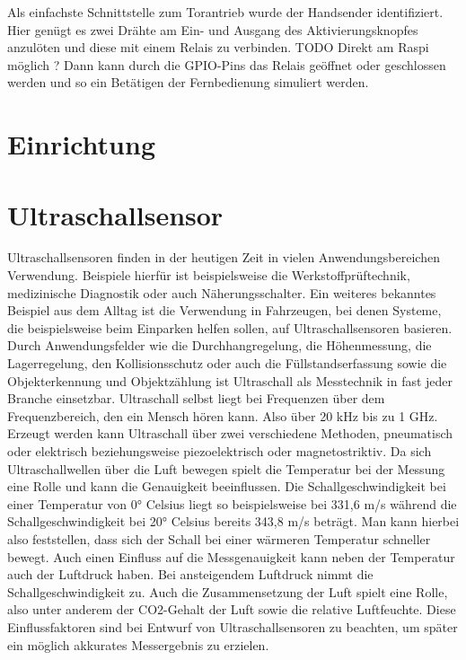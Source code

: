 Als einfachste Schnittstelle zum Torantrieb wurde der Handsender identifiziert. Hier genügt es zwei Drähte am Ein- und Ausgang des Aktivierungsknopfes anzulöten und diese mit einem Relais zu verbinden. TODO Direkt am Raspi möglich ? Dann kann durch die \ac{GPIO}-Pins das Relais geöffnet oder geschlossen werden und so ein Betätigen der Fernbedienung simuliert werden.

\section{Einrichtung}


\section{Ultraschallsensor}
Ultraschallsensoren finden in der heutigen Zeit in vielen Anwendungsbereichen Verwendung. Beispiele hierfür ist beispielsweise die Werkstoffprüftechnik, medizinische Diagnostik oder auch Näherungsschalter. Ein weiteres bekanntes Beispiel aus dem Alltag ist die Verwendung in Fahrzeugen, bei denen Systeme, die beispielsweise beim Einparken helfen sollen, auf Ultraschallsensoren basieren. Durch Anwendungsfelder wie die Durchhangregelung, die Höhenmessung, die Lagerregelung, den Kollisionsschutz oder auch die Füllstandserfassung sowie die Objekterkennung und Objektzählung ist Ultraschall als Messtechnik in fast jeder Branche einsetzbar.\autocite[Vgl.][S. 182]{ultraschall2}
Ultraschall selbst liegt bei Frequenzen über dem Frequenzbereich, den ein Mensch hören kann. Also über 20 kHz bis zu 1 GHz.\autocite[Vgl.][S. 177]{ultraschall2} Erzeugt werden kann Ultraschall über zwei verschiedene Methoden, pneumatisch oder elektrisch beziehungsweise piezoelektrisch oder magnetostriktiv.\autocite[Vgl.][S. 70]{sensoren} Da sich Ultraschallwellen über die Luft bewegen spielt die Temperatur bei der Messung eine Rolle und kann die Genauigkeit beeinflussen. Die Schallgeschwindigkeit bei einer Temperatur von 0° Celsius liegt so beispielsweise bei 331,6 m/s während die Schallgeschwindigkeit bei 20° Celsius bereits 343,8 m/s beträgt. Man kann hierbei also feststellen, dass sich der Schall bei einer wärmeren Temperatur schneller bewegt. 
Auch einen Einfluss auf die Messgenauigkeit kann neben der Temperatur auch der Luftdruck haben. Bei ansteigendem Luftdruck nimmt die Schallgeschwindigkeit zu. Auch die Zusammensetzung der Luft spielt eine Rolle, also unter anderem der CO2-Gehalt der Luft sowie die relative Luftfeuchte. Diese Einflussfaktoren sind bei Entwurf von Ultraschallsensoren zu beachten, um später ein möglich akkurates Messergebnis zu erzielen.\autocite[Vgl.][S. 71]{sensoren}

